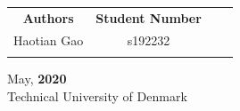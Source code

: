 \begin{titlepage}



\begin{table}[H]
\centering
\begin{tabular}{cccc}
\textbf{Authors} & \textbf{Student Number}\\
Haotian Gao & s192232\\

\\
\end{tabular}
\end{table}


\vfill %
May, \textbf{2020}\\[0.2cm] 
Technical University of Denmark\\[0.2cm]
\end{titlepage}